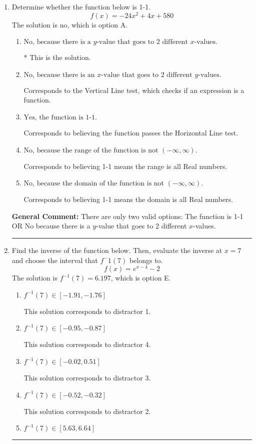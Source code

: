 \documentclass{extbook}[14pt]
\newcommand{\litem}[1]{\item #1

\rule{\textwidth}{0.4pt}}
\begin{document}
\begin{enumerate}\litem{
Determine whether the function below is 1-1.
\[ f(x) = -24 x^2 + 4 x + 580 \]The solution is \( \text{no} \), which is option A.\begin{enumerate}[label=\Alph*.]
\item \( \text{No, because there is a $y$-value that goes to 2 different $x$-values.} \)

* This is the solution.
\item \( \text{No, because there is an $x$-value that goes to 2 different $y$-values.} \)

Corresponds to the Vertical Line test, which checks if an expression is a function.
\item \( \text{Yes, the function is 1-1.} \)

Corresponds to believing the function passes the Horizontal Line test.
\item \( \text{No, because the range of the function is not $(-\infty, \infty)$.} \)

Corresponds to believing 1-1 means the range is all Real numbers.
\item \( \text{No, because the domain of the function is not $(-\infty, \infty)$.} \)

Corresponds to believing 1-1 means the domain is all Real numbers.
\end{enumerate}

\textbf{General Comment:} There are only two valid options: The function is 1-1 OR No because there is a $y$-value that goes to 2 different $x$-values.
}
\litem{
Find the inverse of the function below. Then, evaluate the inverse at $x = 7$ and choose the interval that $f^-1(7)$ belongs to.
\[ f(x) = e^{x-4}-2 \]The solution is \( f^{-1}(7) = 6.197 \), which is option E.\begin{enumerate}[label=\Alph*.]
\item \( f^{-1}(7) \in [-1.91, -1.76] \)

 This solution corresponds to distractor 1.
\item \( f^{-1}(7) \in [-0.95, -0.87] \)

 This solution corresponds to distractor 4.
\item \( f^{-1}(7) \in [-0.02, 0.51] \)

 This solution corresponds to distractor 3.
\item \( f^{-1}(7) \in [-0.52, -0.32] \)

 This solution corresponds to distractor 2.
\item \( f^{-1}(7) \in [5.63, 6.64] \)


\end{enumerate}}
\end{enumerate}
\end{document}
